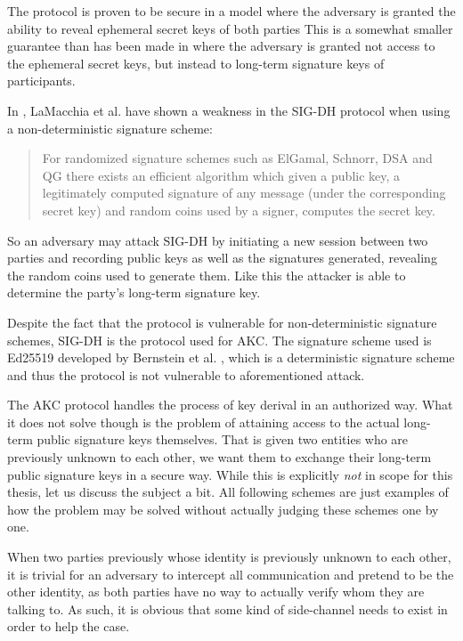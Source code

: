 The protocol is proven to be secure in a model where the adversary is granted the ability to reveal ephemeral secret keys of both parties
This is a somewhat smaller guarantee than has been made in \cite{blake1997key} where the adversary is granted not access to the ephemeral secret keys, but instead to long-term signature keys of participants.

In \cite{lamacchia2007stronger}, LaMacchia et al. have shown a weakness in the SIG-DH protocol when using a non-deterministic signature scheme:
\begin{quote}
    For randomized signature schemes such as ElGamal, Schnorr, DSA and QG there exists an efficient algorithm which given a public key, a legitimately computed signature of any message (under the corresponding secret key) and random coins used by a signer, computes the secret key.
\end{quote}
So an adversary may attack SIG-DH by initiating a new session between two parties and recording public keys as well as the signatures generated, revealing the random coins used to generate them.
Like this the attacker is able to determine the party's long-term signature key.

Despite the fact that the protocol is vulnerable for non-deterministic signature schemes, SIG-DH is the protocol used for AKC.
The signature scheme used is Ed25519 developed by Bernstein et al. \cite{bernstein2012high}, which is a deterministic signature scheme and thus the protocol is not vulnerable to aforementioned attack.

\bigskip

The AKC protocol handles the process of key derival in an authorized way.
What it does not solve though is the problem of attaining access to the actual long-term public signature keys themselves.
That is given two entities who are previously unknown to each other, we want them to exchange their long-term public signature keys in a secure way.
While this is explicitly \emph{not} in scope for this thesis, let us discuss the subject a bit.
All following schemes are just examples of how the problem may be solved without actually judging these schemes one by one.

When two parties previously whose identity is previously unknown to each other, it is trivial for an adversary to intercept all communication and pretend to be the other identity, as both parties have no way to actually verify whom they are talking to.
As such, it is obvious that some kind of side-channel needs to exist in order to help the case.

